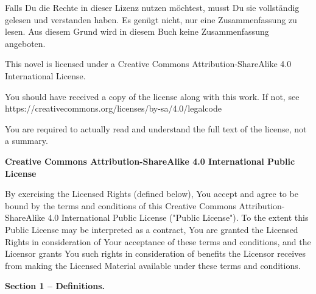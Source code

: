 Falls Du die Rechte in dieser Lizenz nutzen möchtest, musst Du sie vollständig gelesen und verstanden haben. Es genügt nicht, nur eine Zusammenfassung zu lesen. Aus diesem Grund wird in diesem Buch keine Zusammenfassung angeboten.

This novel is licensed under a Creative Commons Attribution-ShareAlike 4.0 International License.

You should have received a copy of the license along with this work. If not, see\\
https://creativecommons.org/licenses/by-sa/4.0/legalcode

You are required to actually read and understand the full text of the license, not a summary.

\begin{center}
    \large{\textbf{Creative Commons Attribution-ShareAlike 4.0 International Public License}}
\end{center}

By exercising the Licensed Rights (defined below), You accept and agree to be bound by the terms and conditions of this Creative Commons Attribution-ShareAlike 4.0 International Public License ("Public License"). To the extent this Public License may be interpreted as a contract, You are granted the Licensed Rights in consideration of Your acceptance of these terms and conditions, and the Licensor grants You such rights in consideration of benefits the Licensor receives from making the Licensed Material available under these terms and conditions.

\begin{center}
    \textbf{Section 1 -- Definitions.}
\end{center}

